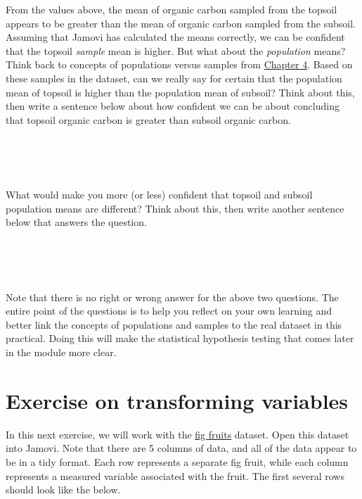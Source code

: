 \documentclass[
]{scrbook}
\begin{document}
From the values above, the mean of organic carbon sampled from the topsoil appears to be greater than the mean of organic carbon sampled from the subsoil.
Assuming that Jamovi has calculated the means correctly, we can be confident that the topsoil \emph{sample} mean is higher.
But what about the \emph{population} means?
Think back to concepts of populations versus samples from \protect\hyperlink{Chapter_4}{Chapter 4}.
Based on these samples in the dataset, can we really say for certain that the population mean of topsoil is higher than the population mean of subsoil?
Think about this, then write a sentence below about how confident we can be about concluding that topsoil organic carbon is greater than subsoil organic carbon.

\begin{verbatim}




\end{verbatim}

What would make you more (or less) confident that topsoil and subsoil population means are different?
Think about this, then write another sentence below that answers the question.

\begin{verbatim}




\end{verbatim}

Note that there is no right or wrong answer for the above two questions.
The entire point of the questions is to help you reflect on your own learning and better link the concepts of populations and samples to the real dataset in this practical.
Doing this will make the statistical hypothesis testing that comes later in the module more clear.

\hypertarget{transforming_variables_02}{%
\section{Exercise on transforming variables}\label{transforming_variables_02}}

In this next exercise, we will work with the \href{https://raw.githubusercontent.com/bradduthie/statistical_techniques/main/data/fig_fruits.csv}{fig fruits} dataset.
Open this dataset into Jamovi.
Note that there are 5 columns of data, and all of the data appear to be in a tidy format.
Each row represents a separate fig fruit, while each column represents a measured variable associated with the fruit.
The first several rows should look like the below.
\end{document}
